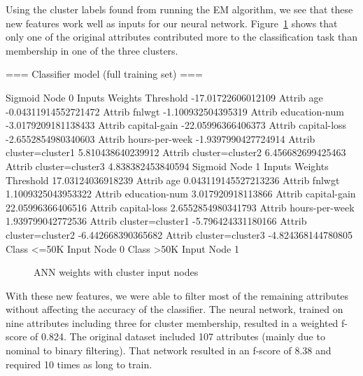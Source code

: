 \documentclass{sig-alternate}
\begin{document}
Using the cluster labels found from running the EM algorithm, we see that these new features work well as inputs for our neural network. Figure~\ref{ann-cluster-weights} shows that only one of the original attributes contributed more to the classification task than membership in one of the three clusters. 


\scriptsize
\begin{verbbox}
=== Classifier model (full training set) ===

Sigmoid Node 0
    Inputs    Weights
    Threshold    -17.01722606012109
    Attrib age    -0.04311914552721472
    Attrib fnlwgt    -1.100932504395319
    Attrib education-num    -3.0179209181138433
    Attrib capital-gain    -22.05996366406373
    Attrib capital-loss    -2.6552854980340603
    Attrib hours-per-week    -1.9397990427724914
    Attrib cluster=cluster1    5.810438640239912
    Attrib cluster=cluster2    6.456682699425463
    Attrib cluster=cluster3    4.838382453840594
Sigmoid Node 1
    Inputs    Weights
    Threshold    17.03124036918239
    Attrib age    0.043119145527213236
    Attrib fnlwgt    1.1009325043953322
    Attrib education-num    3.017920918113866
    Attrib capital-gain    22.05996366406516
    Attrib capital-loss    2.6552854980341793
    Attrib hours-per-week    1.939799042772536
    Attrib cluster=cluster1    -5.796424331180166
    Attrib cluster=cluster2    -6.442668390365682
    Attrib cluster=cluster3    -4.824368144780805
Class  <=50K
    Input
    Node 0
Class  >50K
    Input
    Node 1
\end{verbbox}
\normalsize

\begin{figure}[!htbp]
    \centering
    \theverbbox
    \caption{ANN weights with cluster input nodes\label{ann-cluster-weights}}
\end{figure}

With these new features, we were able to filter most of the remaining attributes without affecting the accuracy of the classifier. The neural network, trained on nine attributes including three for cluster membership, resulted in a weighted f-score of 0.824. The original dataset included 107 attributes (mainly due to nominal to binary filtering). That network resulted in an f-score of 8.38 and required 10 times as long to train.


\end{document}
